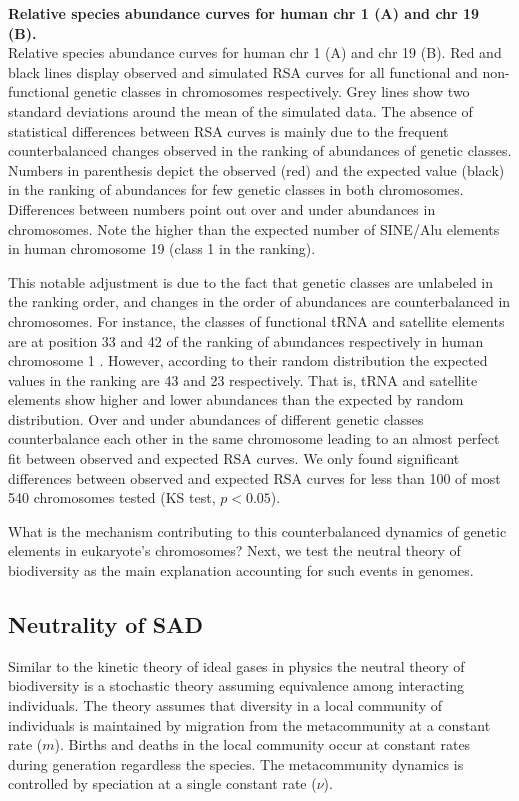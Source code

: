 \begin{FPfigure}
\caption[Relative species abundance curves for human chr 1 and chr 19]{{\bf Relative species abundance curves for human chr 1 (A) and chr 19 (B).} \\ Relative species abundance curves for human chr 1 (A) and chr 19 (B). Red and black lines display observed and simulated RSA curves for all functional and non-functional genetic classes in chromosomes respectively. Grey lines show two standard deviations around the mean of the simulated data. The absence of statistical differences between RSA curves is mainly due to the frequent counterbalanced changes observed in the ranking of abundances of genetic classes. Numbers in parenthesis depict the observed (red) and the expected value (black) in the ranking of abundances for few genetic classes in both chromosomes. Differences between numbers point out over and under abundances in chromosomes. Note the higher than the expected number of SINE/Alu elements in human chromosome 19 (class 1 in the ranking).} 
\label{fig:rsa_chromosomes}
\end{FPfigure}

This notable adjustment is due to the fact that genetic classes are unlabeled in the ranking order, and changes in the order of abundances are counterbalanced in chromosomes. For instance, the classes of functional tRNA and satellite elements are at position 33 and 42 of the ranking of abundances respectively in human chromosome 1 . However, according to their random distribution the expected values in the ranking are 43 and 23 respectively. That is, tRNA and satellite elements show higher and lower abundances than the expected by random distribution. Over and under abundances of different genetic classes counterbalance each other in the same chromosome leading to an almost perfect fit between observed and expected RSA curves. We only found significant differences between observed and expected RSA curves for less than 100 of most 540 chromosomes tested (KS test, $p< 0.05$).

What is the mechanism contributing to this counterbalanced dynamics of genetic elements in eukaryote's chromosomes? Next, we test the neutral theory of biodiversity as the main explanation accounting for such events in genomes.


\subsection{Neutrality of SAD}

Similar to the kinetic theory of ideal gases in physics the neutral theory of biodiversity is a stochastic theory assuming equivalence among interacting individuals. The theory assumes that diversity in a local community of individuals is maintained by migration from the metacommunity at a constant rate ($m$). Births and deaths in the local community occur at constant rates during generation regardless the species. The metacommunity dynamics is controlled by speciation at a single constant rate ($\nu$)\cite{Rosindell2011,Alonso2006}.


